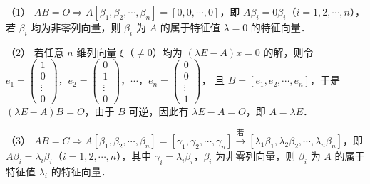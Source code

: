 


\begin{fcard}{（1）}
$AB=O\Rightarrow A[\beta_1,\beta_2,\cdots,\beta_n]=[0,0,\cdots,0]$，即 $A\beta_i=0\beta_i$（$i=1,2,\cdots,n$），若 $\beta_i$ 均为非零列向量，则 $\beta_i$ 为 $A$ 的属于特征值 $\lambda=0$ 的特征向量．
\end{fcard}

\begin{fcard}{（2）}
若任意 $n$ 维列向量 $\xi$（$\ne0$）均为 $(\lambda E-A)x=0$ 的解，则令 $e_1=\begin{pmatrix}1\\0\\\vdots\\0\end{pmatrix}$，$e_2=\begin{pmatrix}0\\1\\\vdots\\0\end{pmatrix}$，$\cdots$，$e_n=\begin{pmatrix}0\\0\\\vdots\\1\end{pmatrix}$，
且 $B=[e_1,e_2,\cdots,e_n]$，于是 $(\lambda E-A)B=O$，由于 $B$ 可逆，因此有 $\lambda E-A=O$，即 $A=\lambda E$．
\end{fcard}

\begin{fcard}{（3）}
$AB=C\Rightarrow A[\beta_1,\beta_2,\cdots,\beta_n]=[\gamma_1,\gamma_2,\cdots,\gamma_n]\xrightarrow{\text{若}}[\lambda_1\beta_1,\lambda_2\beta_2,\cdots,\lambda_n\beta_n]$，即 $A\beta_i=\lambda_i\beta_i$（$i=1,2,\cdots,n$），其中 $\gamma_i=\lambda_i\beta_i$，$\beta_i$ 为非零列向量，则 $\beta_i$ 为 $A$ 的属于特征值 $\lambda_i$ 的特征向量．
\end{fcard}

